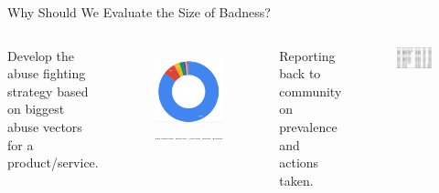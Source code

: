 \documentclass[nobackground,dvipsnames,table,aspectratio=169]{beamer}
\begin{document}
\begin{frame}{Why Should We Evaluate the Size of Badness?}
    \begin{columns}[T]
            \centering
            \small{Develop the abuse fighting strategy based on biggest abuse vectors for a product/service.}
            \begin{figure}
                \includegraphics[width=\textwidth]{abuse-vectors}
                \includegraphics[width=1.25\textwidth]{abuse-vectors-key}
            \end{figure}
            \centering
            \small{Reporting back to community on prevalence and actions taken.}
            \begin{figure}
                \includegraphics[width=\textwidth]{facebook-community-reports}
            \end{figure}
    \end{columns}
\end{frame}
\end{document}
